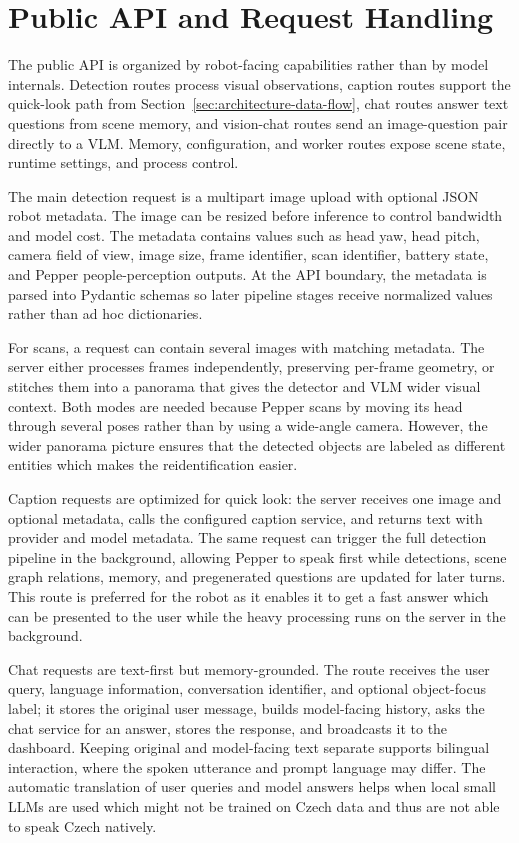 \section{Public API and Request Handling}\label{sec:server-public-api}

The public API is organized by robot-facing capabilities rather than by model internals.
Detection routes process visual observations, caption routes support the quick-look path from Section~\ref{sec:architecture-data-flow}, chat routes answer text questions from scene memory, and vision-chat routes send an image-question pair directly to a VLM.
Memory, configuration, and worker routes expose scene state, runtime settings, and process control.

The main detection request is a multipart image upload with optional JSON robot metadata.
The image can be resized before inference to control bandwidth and model cost.
The metadata contains values such as head yaw, head pitch, camera field of view, image size, frame identifier, scan identifier, battery state, and Pepper people-perception outputs.
At the API boundary, the metadata is parsed into Pydantic schemas so later pipeline stages receive normalized values rather than ad hoc dictionaries.

For scans, a request can contain several images with matching metadata.
The server either processes frames independently, preserving per-frame geometry, or stitches them into a panorama that gives the detector and VLM wider visual context.
Both modes are needed because Pepper scans by moving its head through several poses rather than by using a wide-angle camera. However, the wider panorama picture ensures that the detected objects are labeled as different entities which makes the reidentification easier.

Caption requests are optimized for quick look: the server receives one image and optional metadata, calls the configured caption service, and returns text with provider and model metadata.
The same request can trigger the full detection pipeline in the background, allowing Pepper to speak first while detections, scene graph relations, memory, and pregenerated questions are updated for later turns. This route is preferred for the robot as it enables it to get a fast answer which can be presented to the user while the heavy processing runs on the server in the background.

Chat requests are text-first but memory-grounded.
The route receives the user query, language information, conversation identifier, and optional object-focus label; it stores the original user message, builds model-facing history, asks the chat service for an answer, stores the response, and broadcasts it to the dashboard.
Keeping original and model-facing text separate supports bilingual interaction, where the spoken utterance and prompt language may differ. The automatic translation of user queries and model answers helps when local small LLMs are used which might not be trained on Czech data and thus are not able to speak Czech natively.


